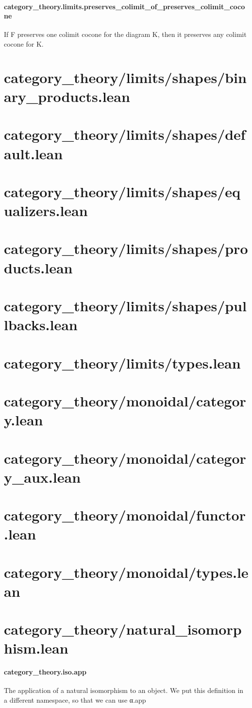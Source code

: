 \documentclass{article}
\begin{document}
\paragraph{category\_theory.limits.preserves\_colimit\_of\_preserves\_colimit\_cocone}
\par
If F preserves one colimit cocone for the diagram K,
then it preserves any colimit cocone for K.
\section{category\_theory/limits/shapes/binary\_products.lean}\section{category\_theory/limits/shapes/default.lean}\section{category\_theory/limits/shapes/equalizers.lean}\section{category\_theory/limits/shapes/products.lean}\section{category\_theory/limits/shapes/pullbacks.lean}\section{category\_theory/limits/types.lean}\section{category\_theory/monoidal/category.lean}\section{category\_theory/monoidal/category\_aux.lean}\section{category\_theory/monoidal/functor.lean}\section{category\_theory/monoidal/types.lean}\section{category\_theory/natural\_isomorphism.lean}\paragraph{category\_theory.iso.app}
\par
The application of a natural isomorphism to an object. We put this definition in a different namespace, so that we can use α.app
\end{document}
